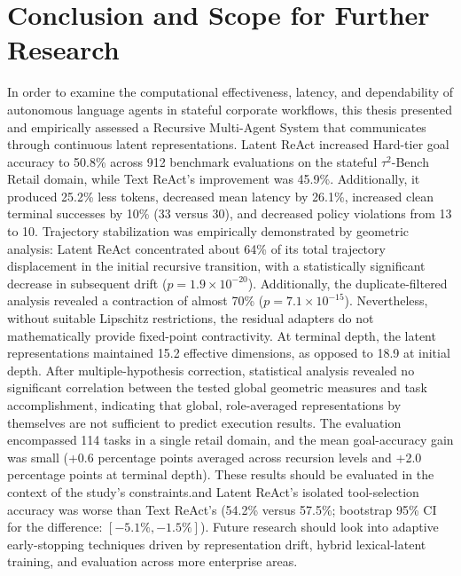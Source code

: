 \documentclass[a4paper, 12pt]{report}
\begin{document}
\chapter{Conclusion and Scope for Further Research}
\fi

\label{chap.6}
In order to examine the computational effectiveness, latency, and dependability of autonomous language agents in stateful corporate workflows, this thesis presented and empirically assessed a Recursive Multi-Agent System that communicates through continuous latent representations. Latent ReAct increased Hard-tier goal accuracy to 50.8\% across 912 benchmark evaluations on the stateful $\tau^2$-Bench Retail domain, while Text ReAct's improvement was 45.9\%. Additionally, it produced 25.2\% less tokens, decreased mean latency by 26.1\%, increased clean terminal successes by 10\% (33 versus 30), and decreased policy violations from 13 to 10. Trajectory stabilization was empirically demonstrated by geometric analysis: Latent ReAct concentrated about 64\% of its total trajectory displacement in the initial recursive transition, with a statistically significant decrease in subsequent drift ($p = 1.9 \times 10^{-20}$). Additionally, the duplicate-filtered analysis revealed a contraction of almost 70\% ($p = 7.1 \times 10^{-15}$). Nevertheless, without suitable Lipschitz restrictions, the residual adapters do not mathematically provide fixed-point contractivity. At terminal depth, the latent representations maintained 15.2 effective dimensions, as opposed to 18.9 at initial depth. After multiple-hypothesis correction, statistical analysis revealed no significant correlation between the tested global geometric measures and task accomplishment, indicating that global, role-averaged representations by themselves are not sufficient to predict execution results. The evaluation encompassed 114 tasks in a single retail domain, and the mean goal-accuracy gain was small (+0.6 percentage points averaged across recursion levels and +2.0 percentage points at terminal depth). These results should be evaluated in the context of the study's constraints.and Latent ReAct's isolated tool-selection accuracy was worse than Text ReAct's (54.2\% versus 57.5\%; bootstrap 95\% CI for the difference: $[-5.1\%, -1.5\%]$). Future research should look into adaptive early-stopping techniques driven by representation drift, hybrid lexical-latent training, and evaluation across more enterprise areas.

\ifdefined\isincluded
\else
\end{document}
